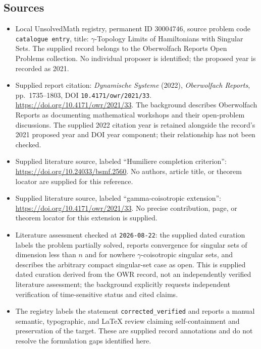 \documentclass[11pt]{article}
\begin{document}
\subsection{Sources}
\begin{itemize}
\item Local UnsolvedMath registry, permanent ID \(30004746\), source problem code \texttt{catalogue entry}, title: \(\gamma\)-Topology Limits of Hamiltonians with Singular Sets. The supplied record belongs to the Oberwolfach Reports Open Problems collection. No individual proposer is identified; the proposed year is recorded as 2021.
\item Supplied report citation: \emph{Dynamische Systeme} (2022), \emph{Oberwolfach Reports}, pp.~1735--1803, DOI \texttt{10.4171/owr/2021/33}. \url{https://doi.org/10.4171/owr/2021/33}. The background describes Oberwolfach Reports as documenting mathematical workshops and their open-problem discussions. The supplied 2022 citation year is retained alongside the record's 2021 proposed year and DOI year component; their relationship has not been checked.
\item Supplied literature source, labeled ``Humiliere completion criterion'': \url{https://doi.org/10.24033/bsmf.2560}. No authors, article title, or theorem locator are supplied for this reference.
\item Supplied literature source, labeled ``gamma-coisotropic extension'': \url{https://doi.org/10.4171/owr/2021/33}. No precise contribution, page, or theorem locator for this extension is supplied.
\item Literature assessment checked at \texttt{2026-08-22}: the supplied dated curation labels the problem partially solved, reports convergence for singular sets of dimension less than \(n\) and for nowhere \(\gamma\)-coisotropic singular sets, and describes the arbitrary compact singular-set case as open. This is supplied dated curation derived from the OWR record, not an independently verified literature assessment; the background explicitly requests independent verification of time-sensitive status and cited claims.
\item The registry labels the statement \texttt{corrected\_verified} and reports a manual semantic, typographic, and LaTeX review claiming self-containment and preservation of the target. These are supplied record annotations and do not resolve the formulation gaps identified here.
\end{itemize}
\end{document}
